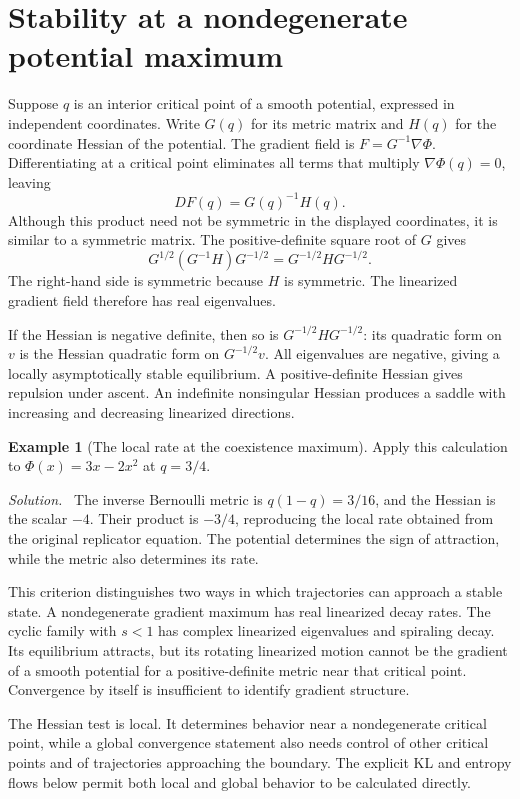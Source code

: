 \documentclass[11pt,oneside,openany]{book}
\theoremstyle{definition}
\newtheorem{example}{Example}[chapter]
\theoremstyle{remark}
\newenvironment{solution}{\par\smallskip\noindent\textit{Solution.}\ }{\par\smallskip}
\numberwithin{equation}{chapter}
\begin{document}
\section{Stability at a nondegenerate potential maximum}
Suppose $q$ is an interior critical point of a smooth potential, expressed in independent coordinates. Write $G(q)$ for its metric matrix and $H(q)$ for the coordinate Hessian of the potential. The gradient field is $F=G^{-1}\nabla\Phi$. Differentiating at a critical point eliminates all terms that multiply $\nabla\Phi(q)=0$, leaving
\[
DF(q)=G(q)^{-1}H(q).
\]
Although this product need not be symmetric in the displayed coordinates, it is similar to a symmetric matrix. The positive-definite square root of $G$ gives
\[
G^{1/2}(G^{-1}H)G^{-1/2}=G^{-1/2}HG^{-1/2}.
\]
The right-hand side is symmetric because $H$ is symmetric. The linearized gradient field therefore has real eigenvalues.

If the Hessian is negative definite, then so is $G^{-1/2}HG^{-1/2}$: its quadratic form on $v$ is the Hessian quadratic form on $G^{-1/2}v$. All eigenvalues are negative, giving a locally asymptotically stable equilibrium. A positive-definite Hessian gives repulsion under ascent. An indefinite nonsingular Hessian produces a saddle with increasing and decreasing linearized directions.

\begin{example}[The local rate at the coexistence maximum]
Apply this calculation to $\Phi(x)=3x-2x^2$ at $q=3/4$.
\begin{solution}
The inverse Bernoulli metric is $q(1-q)=3/16$, and the Hessian is the scalar $-4$. Their product is $-3/4$, reproducing the local rate obtained from the original replicator equation. The potential determines the sign of attraction, while the metric also determines its rate.
\end{solution}
\end{example}

This criterion distinguishes two ways in which trajectories can approach a stable state. A nondegenerate gradient maximum has real linearized decay rates. The cyclic family with $s<1$ has complex linearized eigenvalues and spiraling decay. Its equilibrium attracts, but its rotating linearized motion cannot be the gradient of a smooth potential for a positive-definite metric near that critical point. Convergence by itself is insufficient to identify gradient structure.

The Hessian test is local. It determines behavior near a nondegenerate critical point, while a global convergence statement also needs control of other critical points and of trajectories approaching the boundary. The explicit KL and entropy flows below permit both local and global behavior to be calculated directly.
\end{document}
